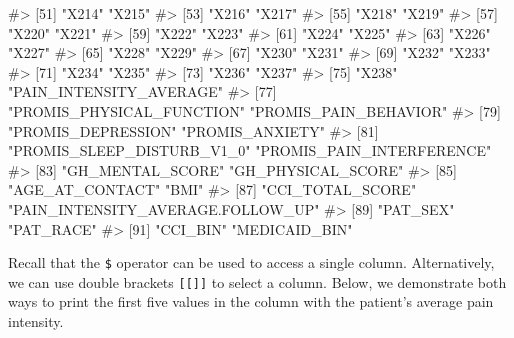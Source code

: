 \documentclass[
  letterpaper,
]{krantz}
\makeatletter
\newenvironment{Shaded}{\begin{snugshade}}{\end{snugshade}}
\newcommand{\CommentTok}[1]{\textcolor[rgb]{0.37,0.37,0.37}{#1}}
\newenvironment{kframe}{%
\medskip{}
\setlength{\fboxsep}{.8em}
 \def\at@end@of@kframe{}%
 \ifinner\ifhmode%
  \def\at@end@of@kframe{\end{minipage}}%
  \begin{minipage}{\columnwidth}%
 \fi\fi%
 \def\FrameCommand##1{\hskip\@totalleftmargin \hskip-\fboxsep
 \colorbox{shadecolor}{##1}\hskip-\fboxsep
     \hskip-\linewidth \hskip-\@totalleftmargin \hskip\columnwidth}%
 \MakeFramed {\advance\hsize-\width
   \@totalleftmargin\z@ \linewidth\hsize
   \@setminipage}}%
 {\par\unskip\endMakeFramed%
 \at@end@of@kframe}
\renewenvironment{Shaded}{\begin{kframe}}{\end{kframe}}
\makeatother
\begin{document}
\begin{Shaded}
\begin{Highlighting}[]
\CommentTok{\#\textgreater{} [51] "X214"                             "X215"                            }
\CommentTok{\#\textgreater{} [53] "X216"                             "X217"                            }
\CommentTok{\#\textgreater{} [55] "X218"                             "X219"                            }
\CommentTok{\#\textgreater{} [57] "X220"                             "X221"                            }
\CommentTok{\#\textgreater{} [59] "X222"                             "X223"                            }
\CommentTok{\#\textgreater{} [61] "X224"                             "X225"                            }
\CommentTok{\#\textgreater{} [63] "X226"                             "X227"                            }
\CommentTok{\#\textgreater{} [65] "X228"                             "X229"                            }
\CommentTok{\#\textgreater{} [67] "X230"                             "X231"                            }
\CommentTok{\#\textgreater{} [69] "X232"                             "X233"                            }
\CommentTok{\#\textgreater{} [71] "X234"                             "X235"                            }
\CommentTok{\#\textgreater{} [73] "X236"                             "X237"                            }
\CommentTok{\#\textgreater{} [75] "X238"                             "PAIN\_INTENSITY\_AVERAGE"          }
\CommentTok{\#\textgreater{} [77] "PROMIS\_PHYSICAL\_FUNCTION"         "PROMIS\_PAIN\_BEHAVIOR"            }
\CommentTok{\#\textgreater{} [79] "PROMIS\_DEPRESSION"                "PROMIS\_ANXIETY"                  }
\CommentTok{\#\textgreater{} [81] "PROMIS\_SLEEP\_DISTURB\_V1\_0"        "PROMIS\_PAIN\_INTERFERENCE"        }
\CommentTok{\#\textgreater{} [83] "GH\_MENTAL\_SCORE"                  "GH\_PHYSICAL\_SCORE"               }
\CommentTok{\#\textgreater{} [85] "AGE\_AT\_CONTACT"                   "BMI"                             }
\CommentTok{\#\textgreater{} [87] "CCI\_TOTAL\_SCORE"                  "PAIN\_INTENSITY\_AVERAGE.FOLLOW\_UP"}
\CommentTok{\#\textgreater{} [89] "PAT\_SEX"                          "PAT\_RACE"                        }
\CommentTok{\#\textgreater{} [91] "CCI\_BIN"                          "MEDICAID\_BIN"}
\end{Highlighting}
\end{Shaded}

Recall that the \texttt{\$} operator can be used to access a single
column. Alternatively, we can use double brackets \texttt{{[}{[}{]}{]}}
to select a column. Below, we demonstrate both ways to print the first
five values in the column with the patient's average pain intensity.
\end{document}
